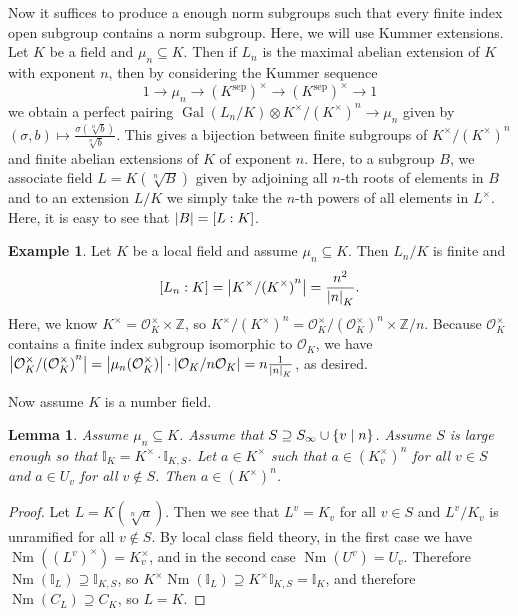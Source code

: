 \documentclass[leqno, openany]{memoir}
\newtheorem{lem}[thm]{Lemma}
\theoremstyle{definition}
\newtheorem{exm}[thm]{Example}
\theoremstyle{remark}
\theoremstyle{plain}
\theoremstyle{definition}
\theoremstyle{remark}
\newcommand{\Z}{\mathbb{Z}}
\newcommand{\I}{\mathbb{I}}
\newcommand{\mc}[1]{\mathcal{#1}}
\newcommand{\mr}[1]{\mathrm{#1}}
\DeclareMathOperator{\Gal}{Gal}
\DeclareMathOperator{\Nm}{Nm}
\begin{document}
Now it suffices to produce a enough norm subgroups such that every finite index open subgroup contains a norm subgroup. Here, we will use Kummer extensions. Let $K$ be a field and $\mu_n \subseteq K$. Then if $L_n$ is the maximal abelian extension of $K$ with exponent $n$, then by considering the Kummer sequence
\[ 1 \to \mu_n \to {(K^{\mr{sep}})}^{\times} \to {(K^{\mr{sep}})}^{\times} \to 1 \]
we obtain a perfect pairing $\Gal(L_n/K) \otimes K^{\times}/{(K^{\times})}^n \to \mu_n$ given by $(\sigma, b) \mapsto \frac{\sigma(\sqrt[n]{b})}{\sqrt[n]{b}}$. This gives a bijection between finite subgroups of $K^{\times}/{(K^{\times})}^n$ and finite abelian extensions of $K$ of exponent $n$. Here, to a subgroup $B$, we associate field $L = K(\sqrt[n]{B})$ given by adjoining all $n$-th roots of elements in $B$ and to an extension $L/K$ we simply take the $n$-th powers of all elements in $L^{\times}$. Here, it is easy to see that $\abs{B} = [L:K]$.

\begin{exm}
    Let $K$ be a local field and assume $\mu_n \subseteq K$. Then $L_n/K$ is finite and 
    \[ [L_n:K] = \abs{K^{\times}/{(K^{\times})}^n} = \frac{n^2}{\abs{n}_K}. \]
    Here, we know $K^{\times} = \mc{O}_K^{\times} \times \Z$, so $K^{\times}/{(K^{\times})}^n = \mc{O}_K^{\times}/{(\mc{O}_K^{\times})}^n \times \Z/n$. Because $\mc{O}_K^{\times}$ contains a finite index subgroup isomorphic to $\mc{O}_K$, we have $\abs{\mc{O}_K^{\times}/{(\mc{O}_K^{\times})}^n} = \abs{\mu_n(\mc{O}_K^{\times})} \cdot \abs{\mc{O}_K/n\mc{O}_K} = n \frac{1}{\abs{n}_K}$, as desired.
\end{exm}

Now assume $K$ is a number field. 

\begin{lem}
    Assume $\mu_n \subseteq K$. Assume that $S \supseteq S_{\infty} \cup \qty{v \mid n}$. Assume $S$ is large enough so that $\I_K = K^{\times} \cdot \I_{K,S}$. Let $a \in K^{\times}$ such that $a \in { ( K_v^{\times} ) }^n$ for all $v \in S$ and $a \in U_v$ for all $v \notin S$. Then $a \in {(K^{\times})}^n$.
\end{lem}

\begin{proof}
    Let $L = K(\sqrt[n]{a})$. Then we see that $L^v = K_v$ for all $v \in S$ and $L^v/K_v$ is unramified for all $v \notin S$. By local class field theory, in the first case we have $\Nm({(L^v)}^{\times}) = K_v^{\times}$, and in the second case $\Nm(U^v) = U_v$. Therefore $\Nm(\I_L) \supseteq \I_{K,S}$, so $K^{\times} \Nm(\I_L) \supseteq K^{\times} \I_{K,S} = \I_K$, and therefore $\Nm(C_L) \supseteq C_K$, so $L=K$.
\end{proof}
\end{document}

